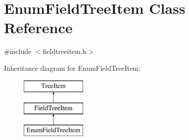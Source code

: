 \hypertarget{class_enum_field_tree_item}{\section{\-Enum\-Field\-Tree\-Item \-Class \-Reference}
\label{class_enum_field_tree_item}
}


{\ttfamily \#include $<$fieldtreeitem.\-h$>$}

\-Inheritance diagram for \-Enum\-Field\-Tree\-Item\-:\begin{figure}[H]
\begin{center}
\leavevmode
\includegraphics[height=3.000000cm]{class_enum_field_tree_item}
\end{center}
\end{figure}
